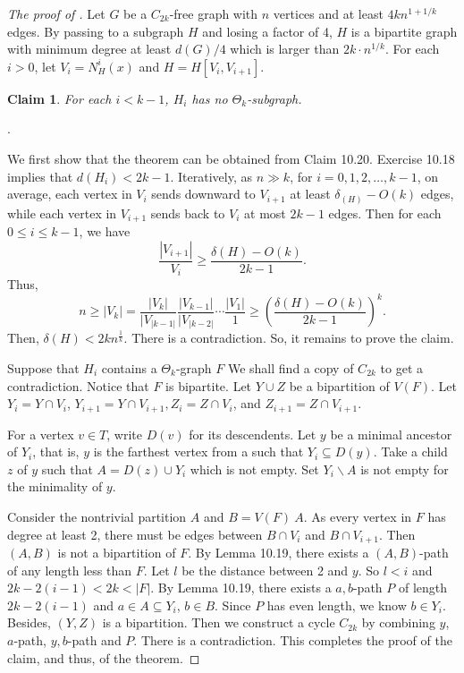 \documentclass{article}
\newtheorem{claim}[theorem]{Claim}
\theoremstyle{definition}
\begin{document}
\begin{proof}[The proof of ]
 Let $G$ be a $C_{2k}$-free graph with $n$ vertices and at least $4kn^{1+1/k}$ edges. By
passing to a subgraph $H$ and losing a factor of 4, $H$ is a bipartite graph with minimum degree at
least $d(G) /4$ which is larger than $2k \cdot n^{1/k}$. For each $i > 0$, let $V_i = N^i_{H}(x)$ and $H = H[V_i, V_{i+1}]$.
   
\begin{claim}
    For each $i < k - 1$, $H_i$ has no $\Theta_k$-subgraph.
\end{claim} .

We first show that the theorem can be obtained from Claim 10.20. Exercise 10.18 implies that
$d(H_i) < 2k -1$. Iteratively, as $n \gg k$, for $i = 0,1,2,\ldots, k - 1$, on average, each vertex in $V_i$ sends downward to $V_{i+1}$ at least $\delta_(H) - O(k)$ edges, while each vertex in $V_{i+1}$ sends back to $V_i$ at most $2k-1$ edges. Then for each $0\leq i\leq k-1$, we have
$$\frac{|V_{i+1}|}{V_i}\geq \frac{\delta(H)-O(k)}{2k-1}.$$
Thus,$$ n\geq |V_k|= \frac{|V_k|}{|V_|k-1|} \frac{|V_{k-1}|}{|V_|k-2|} \cdots \frac{|V_1|}{1}\geq (\frac{\delta(H)-O(k)}{2k-1})^k.$$
Then, $\delta(H)< 2kn^{\frac{1}{k}}$. There is a contradiction. So, it remains to prove the claim.\par
Suppose that $H_i$ contains a $\Theta_k$-graph $F$
We shall find a copy of $C_{2k}$ to get a contradiction.
Notice that $F$ is bipartite. Let $Y \cup Z$ be a bipartition of $V (F)$. Let $Y_i = Y \cap V_i$, $Y_{i+1}
= Y \cap V_{i+1}, Z_i=Z \cap V_i$, and $Z_{i+1}
= Z \cap V_{i+1}$.

For a vertex $v \in T$, write $D(v)$ for its descendents. Let $y$ be a minimal ancestor of $Y_i$, that is,
$y$ is the farthest vertex from a such that $Y_i \subseteq D(y)$. Take a child $z$ of $y$ such that $A = D(z)\cup Y_i$
which is not empty. Set $Y_i\backslash A$ is not empty for the minimality of $y$.


Consider the nontrivial partition $A$ and $B = V (F)\ A$. As every vertex in $F$ has degree at least
2, there must be edges between $B\cap V_i$ and $B\cap V_{i+1}$. Then $(A, B)$ is not a bipartition of $F$. By
Lemma 10.19, there exists a $(A, B)$-path of any length less than $F$. Let $l$ be the distance between
2 and $y$. So $l < i$ and $2k -2(i-1) < 2k <|F|$. By Lemma 10.19, there exists a $a, b$-path $P$ of length
$2k-2(i-1)$ and $a\in A\subseteq Y_i$, $b \in B$. Since $P$ has even length, we know $b \in Y_i$. Besides, $(Y, Z)$ is
a bipartition. Then we construct a cycle $C_{2k}$ by combining $y$, $a$-path, $y, b$-path and $P$. There is a contradiction. This completes the proof of the claim, and thus, of the theorem.




\end{proof}
\end{document}
